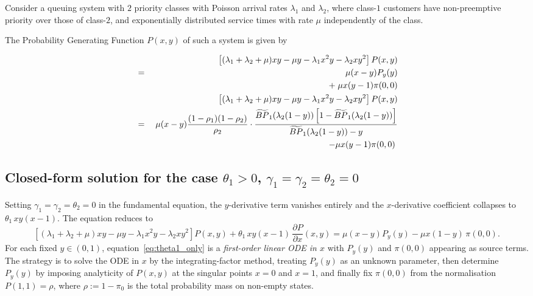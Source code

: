 \begin{theorem}
    
    Consider a queuing system with $2$ priority classes with Poisson arrival rates $\lambda_1$ and $\lambda_2$, where class-$1$ customers have non-preemptive priority over those of class-$2$, and exponentially distributed service times with rate $\mu$ independently of the class.
    
    The Probability Generating Function $P(x,y)$ of such a system is given by
    
    \begin{eqnarray*}
        & & \hspace{-3em} \left[ (\lambda_1 + \lambda_2 +\mu) xy - \mu y - \lambda_1 x^2 y - \lambda_2 xy^2 \right]  P(x,y) \\
        &=& \;      \mu (x-y) P_y(y) \\
        & & + \;  \mu x (y-1) \pi(0,0) \\
        & & \hspace{-3em} \left[ (\lambda_1 + \lambda_2 +\mu) xy - \mu y - \lambda_1 x^2 y - \lambda_2 xy^2 \right]  P(x,y) \\
        &=& \; \mu (x-y) \frac{(1 - \rho_1)(1 - \rho_2)}{ \rho_2} 
        \cdot
        \frac{
            \widetilde{BP}_1(\lambda_2(1-y)) \left[1 - \widetilde{BP}_1(\lambda_2(1-y))\right]
        }{
            \widetilde{BP}_1(\lambda_2(1-y)) - y
        } \\
        & & - \mu x (y-1) \pi(0,0) \; 
    \end{eqnarray*}
\end{theorem}

\subsection{Closed-form solution for the case $\theta_1 > 0$, $\gamma_1 = \gamma_2 = \theta_2 = 0$}
\label{subsec:theta1_only}

Setting $\gamma_1 = \gamma_2 = \theta_2 = 0$ in the fundamental equation, the $y$-derivative term vanishes entirely and the $x$-derivative coefficient collapses to $\theta_1\, xy(x-1)$. The equation reduces to
\begin{equation}
    \left[ (\lambda_1+\lambda_2+\mu)xy - \mu y - \lambda_1 x^2 y - \lambda_2 x y^2 \right] P(x,y)
    + \theta_1\, xy(x-1)\, \frac{\partial P}{\partial x}(x,y)
    = \mu(x-y) P_y(y) - \mu x(1-y)\, \pi(0,0).
    \label{eq:theta1_only}
\end{equation}
For each fixed $y \in (0,1)$, equation~\eqref{eq:theta1_only} is a \emph{first-order linear ODE in $x$} with $P_y(y)$ and $\pi(0,0)$ appearing as source terms. The strategy is to solve the ODE in $x$ by the integrating-factor method, treating $P_y(y)$ as an unknown parameter, then determine $P_y(y)$ by imposing analyticity of $P(x,y)$ at the singular points $x=0$ and $x=1$, and finally fix $\pi(0,0)$ from the normalisation $P(1,1)=\rho$, where $\rho := 1 - \pi_0$ is the total probability mass on non-empty states.

